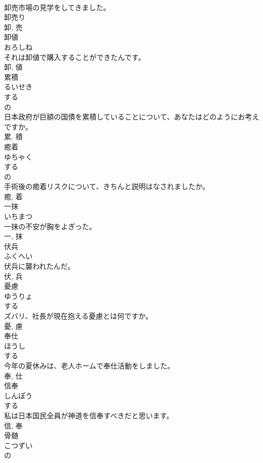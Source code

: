 \documentclass[8pt]{extreport}
\begin{document}
\begin{CJK}{UTF8}{min}
\\	卸売市場の見学をしてきました。	
\\	卸売り 
\\	卸, 売	
\\	卸値	
\\	おろしね	
\\	それは卸値で購入することができたんです。	
\\	卸, 値	
\\	累積	
\\	るいせき	
\\	する 
\\	の 
\\	日本政府が巨額の国債を累積していることについて、あなたはどのようにお考えですか。	
\\	累, 積	
\\	癒着	
\\	ゆちゃく	
\\	する 
\\	の 
\\	手術後の癒着リスクについて、きちんと説明はなされましたか。	
\\	癒, 着	
\\	一抹	
\\	いちまつ	
\\	一抹の不安が胸をよぎった。	
\\	一, 抹	
\\	伏兵	
\\	ふくへい	
\\	伏兵に襲われたんだ。	
\\	伏, 兵	
\\	憂慮	
\\	ゆうりょ	
\\	する 
\\	ズバリ、社長が現在抱える憂慮とは何ですか。	
\\	憂, 慮	
\\	奉仕	
\\	ほうし	
\\	する 
\\	今年の夏休みは、老人ホームで奉仕活動をしました。	
\\	奉, 仕	
\\	信奉	
\\	しんぽう	
\\	する 
\\	私は日本国民全員が神道を信奉すべきだと思います。	
\\	信, 奉	
\\	骨髄	
\\	こつずい	
\\	の 

\end{CJK}
\end{document}

